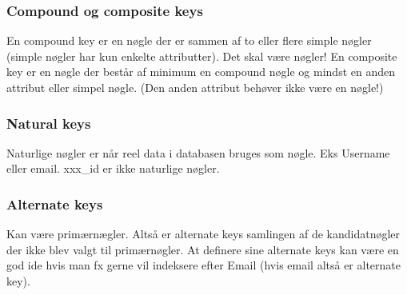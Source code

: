 \subsubsection{Compound og composite keys}
En compound key er en nøgle der er sammen af to eller flere simple nøgler (simple nøgler har kun enkelte attributter). Det skal være nøgler!
En composite key er en nøgle der består af minimum en compound nøgle og mindst en anden attribut eller simpel nøgle. (Den anden attribut behøver ikke være en nøgle!)

\subsubsection{Natural keys}
Naturlige nøgler er når reel data i databasen bruges som nøgle. Eks Username eller email. xxx\_id er ikke naturlige nøgler.

\subsubsection{Alternate keys}
Kan være primærnægler. Altså er alternate keys samlingen af de kandidatnøgler der ikke blev valgt til primærnøgler. At definere sine alternate keys kan være en god ide hvis man fx gerne vil indeksere efter Email (hvis email altså er alternate key).